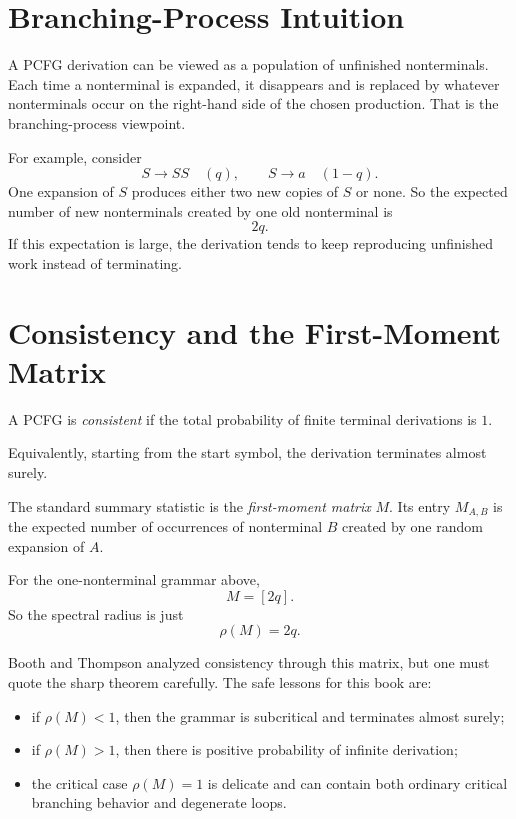 \section{Branching-Process Intuition}

A PCFG derivation can be viewed as a population of unfinished nonterminals. Each time a nonterminal is expanded, it disappears and is replaced by whatever nonterminals occur on the right-hand side of the chosen production. That is the branching-process viewpoint.

For example, consider
\[
  S \to SS \quad (q),
  \qquad
  S \to a \quad (1-q).
\]
One expansion of $S$ produces either two new copies of $S$ or none. So the expected number of new nonterminals created by one old nonterminal is
\[
  2q.
\]
If this expectation is large, the derivation tends to keep reproducing unfinished work instead of terminating.

\section{Consistency and the First-Moment Matrix}

\begin{definition}
A PCFG is \emph{consistent} if the total probability of finite terminal derivations is $1$.
\end{definition}

Equivalently, starting from the start symbol, the derivation terminates almost surely.

The standard summary statistic is the \emph{first-moment matrix} $M$. Its entry $M_{A,B}$ is the expected number of occurrences of nonterminal $B$ created by one random expansion of $A$.

For the one-nonterminal grammar above,
\[
  M = [2q].
\]
So the spectral radius is just
\[
  \rho(M)=2q.
\]

Booth and Thompson analyzed consistency through this matrix, but one must quote the sharp theorem carefully. The safe lessons for this book are:
\begin{itemize}
  \item if $\rho(M)<1$, then the grammar is subcritical and terminates almost surely;
  \item if $\rho(M)>1$, then there is positive probability of infinite derivation;
  \item the critical case $\rho(M)=1$ is delicate and can contain both ordinary critical branching behavior and degenerate loops.
\end{itemize}

